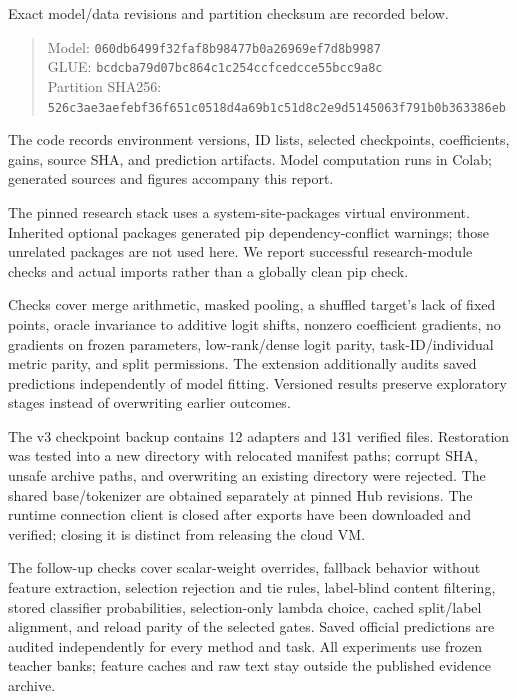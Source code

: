 \documentclass[11pt,a4paper]{article}
\begin{document}
Exact model/data revisions and partition checksum are recorded below.
\begin{quote}\footnotesize
Model: \texttt{060db6499f32faf8b98477b0a26969ef7d8b9987}\\
GLUE: \texttt{bcdcba79d07bc864c1c254ccfcedcce55bcc9a8c}\\
Partition SHA256:\\
\texttt{526c3ae3aefebf36f651c0518d4a69b1c51d8c2e9d5145063f791b0b363386eb}
\end{quote}
The code records environment versions, ID lists, selected checkpoints, coefficients, gains, source SHA, and prediction artifacts. Model computation runs in Colab; generated sources and figures accompany this report.

The pinned research stack uses a system-site-packages virtual environment. Inherited optional packages generated pip dependency-conflict warnings; those unrelated packages are not used here. We report successful research-module checks and actual imports rather than a globally clean pip check.

Checks cover merge arithmetic, masked pooling, a shuffled target's lack of fixed points, oracle invariance to additive logit shifts, nonzero coefficient gradients, no gradients on frozen parameters, low-rank/dense logit parity, task-ID/individual metric parity, and split permissions. The extension additionally audits saved predictions independently of model fitting. Versioned results preserve exploratory stages instead of overwriting earlier outcomes.

The v3 checkpoint backup contains 12 adapters and 131 verified files. Restoration was tested into a new directory with relocated manifest paths; corrupt SHA, unsafe archive paths, and overwriting an existing directory were rejected. The shared base/tokenizer are obtained separately at pinned Hub revisions. The runtime connection client is closed after exports have been downloaded and verified; closing it is distinct from releasing the cloud VM.

The follow-up checks cover scalar-weight overrides, fallback behavior without feature extraction, selection rejection and tie rules, label-blind content filtering, stored classifier probabilities, selection-only lambda choice, cached split/label alignment, and reload parity of the selected gates. Saved official predictions are audited independently for every method and task. All experiments use frozen teacher banks; feature caches and raw text stay outside the published evidence archive.
\end{document}
